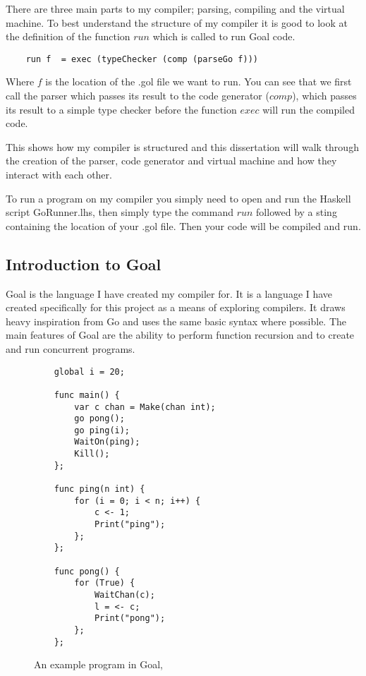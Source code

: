There are three main parts to my compiler; parsing, compiling and the virtual machine. To best understand the structure of my compiler it is good to look at the definition of the function $run$ which is called to run Goal code.

\begin{lstlisting}
 	run f  = exec (typeChecker (comp (parseGo f)))
\end{lstlisting}

Where $f$ is the location of the .gol file we want to run. You can see that we first call the parser which passes its result to the code generator ($comp$), which passes its result to a simple type checker before the function $exec$ will run the compiled code. 

This shows how my compiler is structured and this dissertation will walk through the creation of the parser, code generator and virtual machine and how they interact with each other.

To run a program on my compiler you simply need to open and run the Haskell script GoRunner.lhs, then simply type the command $run$ followed by a sting containing the location of your .gol file. Then your code will be compiled and run. 

\subsection{Introduction to Goal}

Goal is the language I have created my compiler for. It is a language I have created specifically for this project as a means of exploring compilers. It draws heavy inspiration from Go and uses the same basic syntax where possible. The main features of Goal are the ability to perform function recursion and to create and run concurrent programs.

\begin{figure}[h]
\begin{lstlisting}
	global i = 20;
	
	func main() { 
	    var c chan = Make(chan int);
	    go pong();
	    go ping(i);
	    WaitOn(ping);
	    Kill();
	};
	
	func ping(n int) {
	    for (i = 0; i < n; i++) {
	        c <- 1;
	        Print("ping");
	    };    
	};
	
	func pong() {
	    for (True) {
	        WaitChan(c);
	        l = <- c;
	        Print("pong");
	    };    
	};
\end{lstlisting}
\caption{An example program in Goal, }
\label{fig:goalExample} 
\end{figure}

